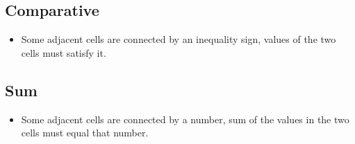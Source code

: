 \subsection*{Comparative}

\begin{itemize}
    \item Some adjacent cells are connected by an inequality sign, values of the two cells must satisfy it.
\end{itemize}


\subsection*{Sum}

\begin{itemize}
    \item Some adjacent cells are connected by a number, sum of the values in the two cells must equal that number.
\end{itemize}

